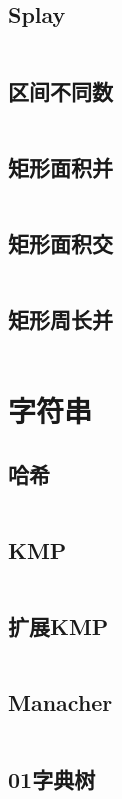 \documentclass[a4paper,13.6pt]{article}
\begin{document}
\begin{CJK}{UTF8}{gbsn}
\subsection{Splay}
\inputminted{c++}{../ACM_Template/Data_Structure/Splay.cpp}
\subsection{区间不同数}
\inputminted{c++}{../ACM_Template/Data_Structure/Different_Numbers_Of_Interval.cpp}
\subsection{矩形面积并}
\inputminted{c++}{../ACM_Template/Data_Structure/Area_And.cpp}
\subsection{矩形面积交}
\inputminted{c++}{../ACM_Template/Data_Structure/Area_cross.cpp}
\subsection{矩形周长并}
\inputminted{c++}{../ACM_Template/Data_Structure/Perimeter_And.cpp}
\newpage

\section{字符串}
\subsection{哈希}
\inputminted{c++}{../ACM_Template/String/Hash.cpp}
\subsection{KMP}
\inputminted{c++}{../ACM_Template/String/KMP.cpp}
\subsection{扩展KMP}
\inputminted{c++}{../ACM_Template/String/Exkmp.cpp}
\subsection{Manacher}
\inputminted{c++}{../ACM_Template/String/Manacher.cpp}
\subsection{01字典树}
\inputminted{c++}{../ACM_Template/String/01Trie.cpp}

\end{CJK}
\end{document}
